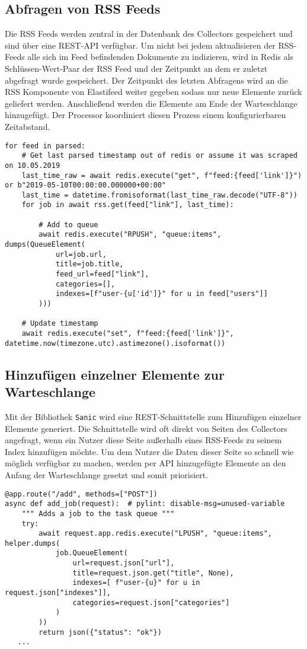 \subsection{Abfragen von RSS Feeds}
Die RSS Feeds werden zentral in der Datenbank des Collectors gespeichert und sind über eine REST-API verfügbar.
Um nicht bei jedem aktualisieren der RSS-Feeds alle sich im Feed befindenden Dokumente zu indizieren, wird in Redis als Schlüssen-Wert-Paar der RSS Feed und der Zeitpunkt an dem er zuletzt abgefragt wurde gespeichert.
Der Zeitpunkt des letzten Abfragens wird an die RSS Komponente von Elastifeed weiter gegeben sodass nur neue Elemente zurück geliefert werden.
Anschließend werden die Elemente am Ende der Warteschlange hinzugefügt.
Der Processor koordiniert diesen Prozess einem konfigurierbaren Zeitabstand.
\begin{lstlisting}
for feed in parsed:
    # Get last parsed timestamp out of redis or assume it was scraped on 10.05.2019
    last_time_raw = await redis.execute("get", f"feed:{feed['link']}") or b"2019-05-10T00:00:00.000000+00:00"
    last_time = datetime.fromisoformat(last_time_raw.decode("UTF-8"))
    for job in await rss.get(feed["link"], last_time):

        # Add to queue
        await redis.execute("RPUSH", "queue:items", dumps(QueueElement(
            url=job.url,
            title=job.title,
            feed_url=feed["link"],
            categories=[],
            indexes=[f"user-{u['id']}" for u in feed["users"]]
        )))

    # Update timestamp
    await redis.execute("set", f"feed:{feed['link']}", datetime.now(timezone.utc).astimezone().isoformat())
\end{lstlisting}

\subsection{Hinzufügen einzelner Elemente zur Warteschlange}
Mit der Bibliothek \texttt{Sanic} wird eine REST-Schnittstelle zum Hinzufügen einzelner Elemente generiert.
Die Schnittstelle wird oft direkt von Seiten des Collectors angefragt, wenn ein Nutzer diese Seite außerhalb eines RSS-Feeds zu seinem Index hinzufügen möchte.
Um dem Nutzer die Daten dieser Seite so schnell wie möglich verfügbar zu machen, werden per API hinzugefügte Elemente an den Anfang der Warteschlange gesetzt und somit priorisiert.
\begin{lstlisting}
@app.route("/add", methods=["POST"])
async def add_job(request):  # pylint: disable-msg=unused-variable
    """ Adds a job to the task queue """
    try:
        await request.app.redis.execute("LPUSH", "queue:items", helper.dumps(
            job.QueueElement(
                url=request.json["url"],
                title=request.json.get("title", None),
                indexes=[ f"user-{u}" for u in request.json["indexes"]],
                categories=request.json["categories"]
            )
        ))
        return json({"status": "ok"})
   ...
\end{lstlisting}
